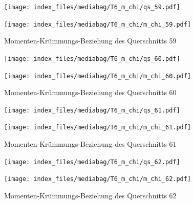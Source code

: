 \documentclass[
  11pt,
  letterpaper,
]{scrreprt}
\begin{document}
\begin{figure}[H]

\begin{minipage}{0.50\linewidth}
\texttt{[image: index\_files/mediabag/T6\_m\_chi/qs\_59.pdf]}\end{minipage}%
%
\begin{minipage}{0.50\linewidth}
\texttt{[image: index\_files/mediabag/T6\_m\_chi/m\_chi\_59.pdf]}\end{minipage}%

\caption{\label{fig-mchi_anhang}Momenten-Krümmungs-Beziehung des
Querschnitts 59}

\end{figure}%

\begin{figure}[H]

\begin{minipage}{0.50\linewidth}
\texttt{[image: index\_files/mediabag/T6\_m\_chi/qs\_60.pdf]}\end{minipage}%
%
\begin{minipage}{0.50\linewidth}
\texttt{[image: index\_files/mediabag/T6\_m\_chi/m\_chi\_60.pdf]}\end{minipage}%

\caption{\label{fig-mchi_anhang}Momenten-Krümmungs-Beziehung des
Querschnitts 60}

\end{figure}%

\begin{figure}[H]

\begin{minipage}{0.50\linewidth}
\texttt{[image: index\_files/mediabag/T6\_m\_chi/qs\_61.pdf]}\end{minipage}%
%
\begin{minipage}{0.50\linewidth}
\texttt{[image: index\_files/mediabag/T6\_m\_chi/m\_chi\_61.pdf]}\end{minipage}%

\caption{\label{fig-mchi_anhang}Momenten-Krümmungs-Beziehung des
Querschnitts 61}

\end{figure}%

\begin{figure}[H]

\begin{minipage}{0.50\linewidth}
\texttt{[image: index\_files/mediabag/T6\_m\_chi/qs\_62.pdf]}\end{minipage}%
%
\begin{minipage}{0.50\linewidth}
\texttt{[image: index\_files/mediabag/T6\_m\_chi/m\_chi\_62.pdf]}\end{minipage}%

\caption{\label{fig-mchi_anhang}Momenten-Krümmungs-Beziehung des
Querschnitts 62}

\end{figure}%
\end{document}
